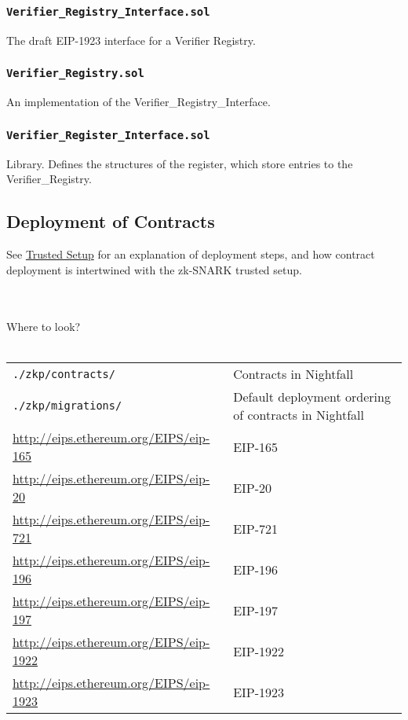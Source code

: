 \documentclass{article}
\begin{document}
\subsubsection{\texttt{Verifier\_Registry\_Interface.sol}}
The draft EIP-1923 interface for a Verifier Registry.

\subsubsection{\texttt{Verifier\_Registry.sol}}
An implementation of the Verifier\_Registry\_Interface.

\subsubsection{\texttt{Verifier\_Register\_Interface.sol}}
Library. Defines the structures of the register, which store entries to the Verifier\_Registry.\\

\subsection{Deployment of Contracts}
\label{sec:deploymentOfContracts}
See \hyperref[fig:trustedSetup]{Trusted Setup} for an explanation of deployment steps, and how contract deployment is intertwined with the zk-SNARK trusted setup.\\
\\
\\

\begin{center}
  \begin{mdframed}[backgroundcolor=verylightblue]
    Where to look?\\
    \\
    \begin{tabular}{lp{14cm}}
      \texttt{./zkp/contracts/} & Contracts in Nightfall\\
      \texttt{./zkp/migrations/} & Default deployment ordering of contracts in Nightfall\\
      \url{http://eips.ethereum.org/EIPS/eip-165} & EIP-165\\
      \url{http://eips.ethereum.org/EIPS/eip-20} & EIP-20\\
      \url{http://eips.ethereum.org/EIPS/eip-721} & EIP-721\\
      \url{http://eips.ethereum.org/EIPS/eip-196} & EIP-196\\
      \url{http://eips.ethereum.org/EIPS/eip-197} & EIP-197\\
      \url{http://eips.ethereum.org/EIPS/eip-1922} & EIP-1922\\
      \url{http://eips.ethereum.org/EIPS/eip-1923} & EIP-1923
    \end{tabular}
  \end{mdframed}
\end{center}
\end{document}
